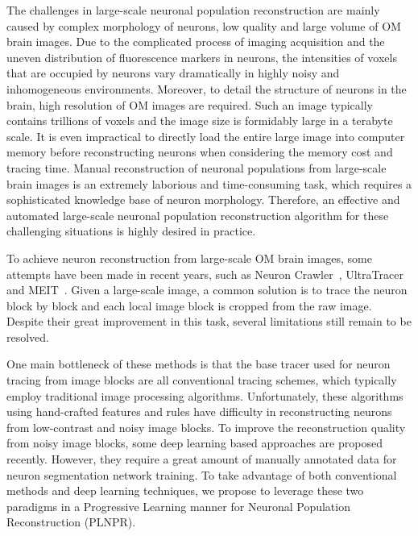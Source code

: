 The challenges in large-scale neuronal population reconstruction are mainly caused by complex morphology of neurons, low quality and large volume of OM brain images.
Due to the complicated process of imaging acquisition and the uneven distribution of fluorescence markers in neurons, the intensities of voxels that are occupied by neurons vary dramatically in highly noisy and inhomogeneous environments.
Moreover, to detail the structure of neurons in the brain, high resolution of OM images are required. Such an image typically contains trillions of voxels and the image size is formidably large in a terabyte scale. It is even impractical to directly load the entire large image into computer memory before reconstructing neurons when considering the memory cost and tracing time.
Manual reconstruction of neuronal populations from large-scale brain images is an extremely laborious and time-consuming task, which requires a sophisticated knowledge base of neuron morphology.
Therefore, an effective and automated large-scale neuronal population reconstruction algorithm for these challenging situations is highly desired in practice.


To achieve neuron reconstruction from large-scale OM brain images, some attempts have been made in recent years, such as Neuron Crawler~\cite{Zhou2015}, UltraTracer~\cite{Peng2017} and MEIT~\cite{Wang2018}.
Given a large-scale image, a common solution is to trace the neuron block by block and each local image block is cropped from the raw image.
Despite their great improvement in this task, several limitations still remain to be resolved.


One main bottleneck of these methods is that the base tracer used for neuron tracing from image blocks are all conventional tracing schemes, which typically employ traditional image processing algorithms. Unfortunately, these algorithms using hand-crafted features and rules have difficulty in reconstructing neurons from low-contrast and noisy image blocks.
To improve the reconstruction quality from noisy image blocks, some deep learning based approaches are proposed recently. However, they require a great amount of manually annotated data for neuron segmentation network training.
%
To take advantage of both conventional methods and deep learning techniques, we propose to leverage these two paradigms in a Progressive Learning manner for Neuronal Population Reconstruction (PLNPR).

